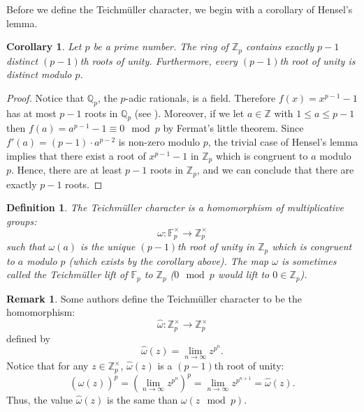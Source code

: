 \documentclass[12pt]{article}
\newtheorem*{defn}{Definition}
\newtheorem*{cor}{Corollary}
\theoremstyle{definition}
\newtheorem*{rem}{Remark}
\newcommand{\Ints}{\mathbb{Z}}
\newcommand{\Rats}{\mathbb{Q}}
\begin{document}
Before we define the Teichm\"uller character, we begin with a corollary of Hensel's lemma.

\begin{cor}
Let $p$ be a prime number. The ring of  $\Ints_p$ contains exactly $p-1$ distinct $(p-1)$th roots of unity. Furthermore, every $(p-1)$th root of unity is distinct modulo $p$.
\end{cor}
\begin{proof}
Notice that $\Rats_p$, the $p$-adic rationals, is a field. Therefore $f(x)=x^{p-1}-1$ has at most $p-1$ roots in $\Rats_p$ (see ). Moreover, if we let $a\in \Ints$ with $1\leq a \leq p-1$ then $f(a)=a^{p-1}-1\equiv 0 \mod p$ by Fermat's little theorem. Since $f'(a)=(p-1)\cdot a^{p-2}$ is non-zero modulo $p$, the trivial case of Hensel's lemma implies that there exist a root of $x^{p-1}-1$ in $\Ints_p$ which is congruent to $a$ modulo $p$. Hence, there are at least $p-1$ roots in $\Ints_p$, and we can conclude that there are exactly $p-1$ roots.  
\end{proof}

\begin{defn}
The Teichm\"uller character is a homomorphism of multiplicative groups:
$$\omega \colon \mathbb{F}_p^\times \to \Ints_p^\times$$
such that $\omega(a)$ is the unique $(p-1)$th root of unity in $\Ints_p$ which is congruent to $a$ modulo $p$ (which exists by the corollary above). The map $\omega$ is sometimes called the Teichm\"uller lift of $\mathbb{F}_p$ to $\Ints_p$ ($0\mod p$ would lift to $0\in \Ints_p$).
\end{defn}

\begin{rem}
Some authors define the Teichm\"uller character to be the homomorphism:
$$\hat{\omega}\colon \Ints_p^\times \to \Ints_p^\times$$
defined by 
$$\hat{\omega}(z)=\lim_{n\to \infty} z^{p^n}.$$
Notice that for any $z\in \Ints_p^\times$, $\hat{\omega}(z)$ is a $(p-1)$th root of unity:
$$(\hat{\omega}(z))^p=\left( \lim_{n\to \infty} z^{p^n} \right)^p= \lim_{n\to \infty} z^{p^{n+1}}=\hat{\omega}(z).$$
Thus, the value $\hat{\omega}(z)$ is the same than $\omega(z \mod p)$.
\end{rem}
\end{document}
